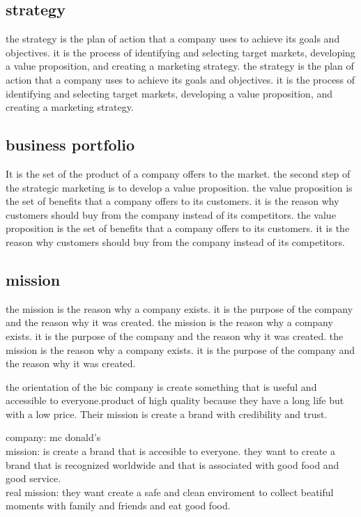 \documentclass[12pt,a4paper]{report}
\begin{document}
\subsection{strategy}
the strategy is the plan of action that a company uses to achieve its goals and objectives. it is the process of identifying and selecting target markets, developing a value proposition, and creating a marketing strategy. the strategy is the plan of action that a company uses to achieve its goals and objectives. it is the process of identifying and selecting target markets, developing a value proposition, and creating a marketing strategy.
\subsection{business portfolio}
It is the set of the product of a company offers to the market.
the second step of the strategic marketing is to develop a value proposition. the value proposition is the set of benefits that a company offers to its customers. it is the reason why customers should buy from the company instead of its competitors. the value proposition is the set of benefits that a company offers to its customers. it is the reason why customers should buy from the company instead of its competitors.
\subsection{mission}
the mission is the reason why a company exists. it is the purpose of the company and the reason why it was created. the mission is the reason why a company exists. it is the purpose of the company and the reason why it was created. the mission is the reason why a company exists. it is the purpose of the company and the reason why it was created.

the orientation of the bic company is create something that is useful and accessible to everyone.product of high quality because they have a long life but with a low price. Their mission is create a brand with credibility and trust.


company: mc donald's
\\mission: is create a brand that is accesible to everyone. they want to create a brand that is recognized worldwide and that is associated with good food and good service.
\\real mission: they want create a safe and clean enviroment to collect beatiful moments with family and friends and eat good food. 
\end{document}
